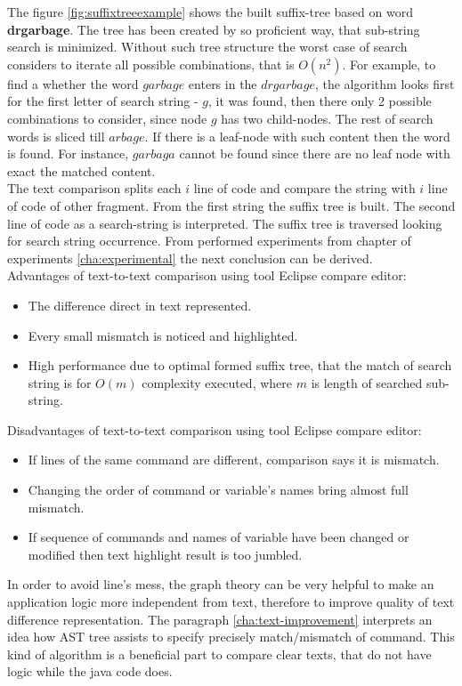 \documentclass{report}
\begin{document}
The figure \ref{fig:suffixtreeexample} shows the built suffix-tree based on word \textbf{drgarbage}. The tree has been created by so proficient way, that sub-string search is minimized. Without such tree structure the worst case of search considers to iterate all possible combinations, that is $O(n^2)$. For example, to find a whether the word $garbage$ enters in the $drgarbage$, the algorithm looks first for the first letter of search string - $g$, it was found, then there only 2 possible combinations to consider, since node $g$ has two child-nodes. The rest of search words is sliced till $arbage$. If there is a leaf-node with such content then the word is found. For instance, $garbaga$ cannot be found since there are no leaf node with exact the matched content.
\\
The text comparison splits each $i$ line of code and compare the string with $i$ line of code of other fragment. From the first string the suffix tree is built. The second line of code as a search-string is interpreted. The suffix tree is traversed looking for search string occurrence. From performed experiments from chapter of experiments \ref{cha:experimental} the next conclusion can be derived. \\
Advantages of text-to-text comparison using tool Eclipse compare editor:
\begin{itemize}
	\item The difference direct in text represented.
	\item Every small mismatch is noticed and highlighted.
	\item High performance due to optimal formed suffix tree, that the match of search string is for $O(m)$ complexity executed, where $m$ is length of searched sub-string.
\end{itemize}
Disadvantages of text-to-text comparison using tool Eclipse compare editor:
\begin{itemize}
	\item If lines of the same command are different, comparison says it is mismatch.
	\item Changing the order of command or variable's names bring almost full mismatch.
	\item If sequence of commands and names of variable have been changed or modified then text highlight result is too jumbled.
\end{itemize}

In order to avoid line's mess, the graph theory can be very helpful to make an application logic more independent from text, therefore to improve quality of text difference representation. The paragraph \ref{cha:text-improvement} interprets an idea how AST tree assists to specify precisely match/mismatch of command. This kind of algorithm is a beneficial part to compare clear texts, that do not have logic while the java code does.
\end{document}
